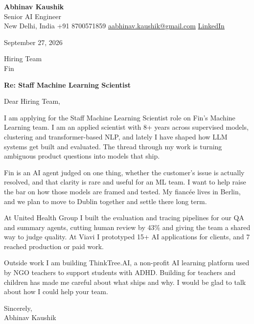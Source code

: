 \documentclass[11pt,a4paper]{article}
\begin{document}
{\Large\bfseries Abhinav Kaushik}\\
Senior AI Engineer\\
New Delhi, India \textbar{} +91 8700571859 \textbar{} \href{mailto:aabhinav.kaushik@gmail.com}{aabhinav.kaushik@gmail.com} \textbar{} \href{https://www.linkedin.com/in/abhinav-kaushik10/}{LinkedIn}  

September 27, 2026

Hiring Team\\
Fin

\textbf{Re: Staff Machine Learning Scientist}

Dear Hiring Team,

I am applying for the Staff Machine Learning Scientist role on Fin's Machine Learning team. I am an applied scientist with 8+ years across supervised models, clustering and transformer-based NLP, and lately I have shaped how LLM systems get built and evaluated. The thread through my work is turning ambiguous product questions into models that ship.

Fin is an AI agent judged on one thing, whether the customer's issue is actually resolved, and that clarity is rare and useful for an ML team. I want to help raise the bar on how those models are framed and tested. My fiancée lives in Berlin, and we plan to move to Dublin together and settle there long term.

At United Health Group I built the evaluation and tracing pipelines for our QA and summary agents, cutting human review by 43\% and giving the team a shared way to judge quality. At Viavi I prototyped 15+ AI applications for clients, and 7 reached production or paid work.

Outside work I am building ThinkTree.AI, a non-profit AI learning platform used by NGO teachers to support students with ADHD. Building for teachers and children has made me careful about what ships and why. I would be glad to talk about how I could help your team.

Sincerely,\\[4pt]
Abhinav Kaushik
\end{document}
